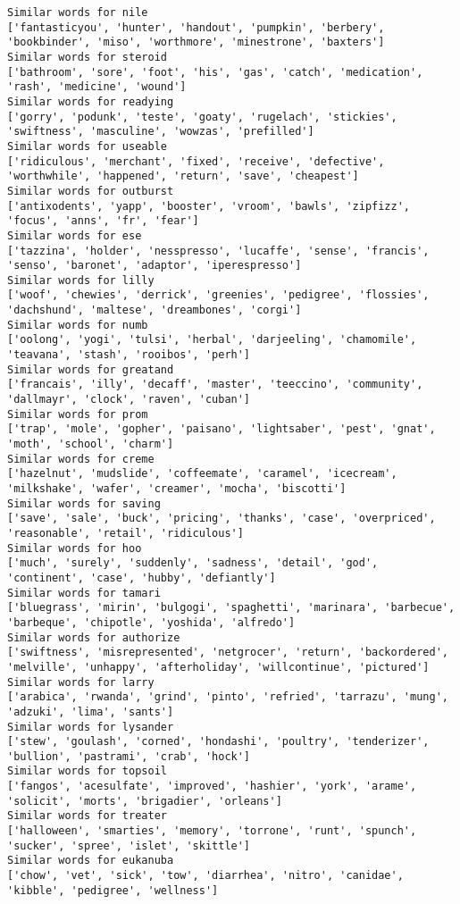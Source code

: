 \documentclass[11pt]{article}
\begin{document}
\begin{Verbatim}[commandchars=\\\{\}]
Similar words for nile
['fantasticyou', 'hunter', 'handout', 'pumpkin', 'berbery', 'bookbinder', 'miso', 'worthmore', 'minestrone', 'baxters']
Similar words for steroid
['bathroom', 'sore', 'foot', 'his', 'gas', 'catch', 'medication', 'rash', 'medicine', 'wound']
Similar words for readying
['gorry', 'podunk', 'teste', 'goaty', 'rugelach', 'stickies', 'swiftness', 'masculine', 'wowzas', 'prefilled']
Similar words for useable
['ridiculous', 'merchant', 'fixed', 'receive', 'defective', 'worthwhile', 'happened', 'return', 'save', 'cheapest']
Similar words for outburst
['antixodents', 'yapp', 'booster', 'vroom', 'bawls', 'zipfizz', 'focus', 'anns', 'fr', 'fear']
Similar words for ese
['tazzina', 'holder', 'nesspresso', 'lucaffe', 'sense', 'francis', 'senso', 'baronet', 'adaptor', 'iperespresso']
Similar words for lilly
['woof', 'chewies', 'derrick', 'greenies', 'pedigree', 'flossies', 'dachshund', 'maltese', 'dreambones', 'corgi']
Similar words for numb
['oolong', 'yogi', 'tulsi', 'herbal', 'darjeeling', 'chamomile', 'teavana', 'stash', 'rooibos', 'perh']
Similar words for greatand
['francais', 'illy', 'decaff', 'master', 'teeccino', 'community', 'dallmayr', 'clock', 'raven', 'cuban']
Similar words for prom
['trap', 'mole', 'gopher', 'paisano', 'lightsaber', 'pest', 'gnat', 'moth', 'school', 'charm']
Similar words for creme
['hazelnut', 'mudslide', 'coffeemate', 'caramel', 'icecream', 'milkshake', 'wafer', 'creamer', 'mocha', 'biscotti']
Similar words for saving
['save', 'sale', 'buck', 'pricing', 'thanks', 'case', 'overpriced', 'reasonable', 'retail', 'ridiculous']
Similar words for hoo
['much', 'surely', 'suddenly', 'sadness', 'detail', 'god', 'continent', 'case', 'hubby', 'defiantly']
Similar words for tamari
['bluegrass', 'mirin', 'bulgogi', 'spaghetti', 'marinara', 'barbecue', 'barbeque', 'chipotle', 'yoshida', 'alfredo']
Similar words for authorize
['swiftness', 'misrepresented', 'netgrocer', 'return', 'backordered', 'melville', 'unhappy', 'afterholiday', 'willcontinue', 'pictured']
Similar words for larry
['arabica', 'rwanda', 'grind', 'pinto', 'refried', 'tarrazu', 'mung', 'adzuki', 'lima', 'sants']
Similar words for lysander
['stew', 'goulash', 'corned', 'hondashi', 'poultry', 'tenderizer', 'bullion', 'pastrami', 'crab', 'hock']
Similar words for topsoil
['fangos', 'acesulfate', 'improved', 'hashier', 'york', 'arame', 'solicit', 'morts', 'brigadier', 'orleans']
Similar words for treater
['halloween', 'smarties', 'memory', 'torrone', 'runt', 'spunch', 'sucker', 'spree', 'islet', 'skittle']
Similar words for eukanuba
['chow', 'vet', 'sick', 'tow', 'diarrhea', 'nitro', 'canidae', 'kibble', 'pedigree', 'wellness']

\end{Verbatim}
\end{document}
